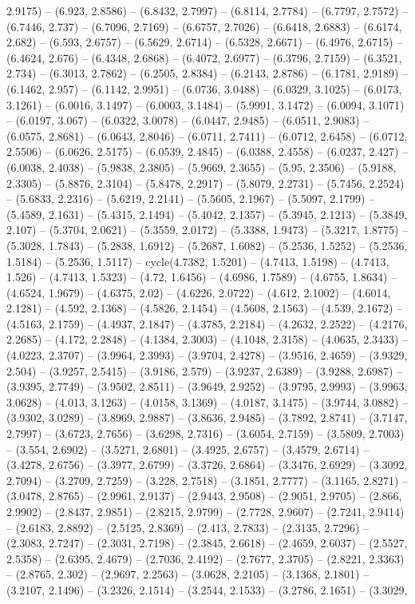 2.9175) -- (6.923, 2.8586) -- (6.8432, 2.7997) -- (6.8114, 2.7784) -- (6.7797, 2.7572) -- (6.7446, 2.737) -- (6.7096, 2.7169) -- (6.6757, 2.7026) -- (6.6418, 2.6883) -- (6.6174, 2.682) -- (6.593, 2.6757) -- (6.5629, 2.6714) -- (6.5328, 2.6671) -- (6.4976, 2.6715) -- (6.4624, 2.676) -- (6.4348, 2.6868) -- (6.4072, 2.6977) -- (6.3796, 2.7159) -- (6.3521, 2.734) -- (6.3013, 2.7862) -- (6.2505, 2.8384) -- (6.2143, 2.8786) -- (6.1781, 2.9189) -- (6.1462, 2.957) -- (6.1142, 2.9951) -- (6.0736, 3.0488) -- (6.0329, 3.1025) -- (6.0173, 3.1261) -- (6.0016, 3.1497) -- (6.0003, 3.1484) -- (5.9991, 3.1472) -- (6.0094, 3.1071) -- (6.0197, 3.067) -- (6.0322, 3.0078) -- (6.0447, 2.9485) -- (6.0511, 2.9083) -- (6.0575, 2.8681) -- (6.0643, 2.8046) -- (6.0711, 2.7411) -- (6.0712, 2.6458) -- (6.0712, 2.5506) -- (6.0626, 2.5175) -- (6.0539, 2.4845) -- (6.0388, 2.4558) -- (6.0237, 2.427) -- (6.0038, 2.4038) -- (5.9838, 2.3805) -- (5.9669, 2.3655) -- (5.95, 2.3506) -- (5.9188, 2.3305) -- (5.8876, 2.3104) -- (5.8478, 2.2917) -- (5.8079, 2.2731) -- (5.7456, 2.2524) -- (5.6833, 2.2316) -- (5.6219, 2.2141) -- (5.5605, 2.1967) -- (5.5097, 2.1799) -- (5.4589, 2.1631) -- (5.4315, 2.1494) -- (5.4042, 2.1357) -- (5.3945, 2.1213) -- (5.3849, 2.107) -- (5.3704, 2.0621) -- (5.3559, 2.0172) -- (5.3388, 1.9473) -- (5.3217, 1.8775) -- (5.3028, 1.7843) -- (5.2838, 1.6912) -- (5.2687, 1.6082) -- (5.2536, 1.5252) -- (5.2536, 1.5184) -- (5.2536, 1.5117) -- cycle(4.7382, 1.5201) -- (4.7413, 1.5198) -- (4.7413, 1.526) -- (4.7413, 1.5323) -- (4.72, 1.6456) -- (4.6986, 1.7589) -- (4.6755, 1.8634) -- (4.6524, 1.9679) -- (4.6375, 2.02) -- (4.6226, 2.0722) -- (4.612, 2.1002) -- (4.6014, 2.1281) -- (4.592, 2.1368) -- (4.5826, 2.1454) -- (4.5608, 2.1563) -- (4.539, 2.1672) -- (4.5163, 2.1759) -- (4.4937, 2.1847) -- (4.3785, 2.2184) -- (4.2632, 2.2522) -- (4.2176, 2.2685) -- (4.172, 2.2848) -- (4.1384, 2.3003) -- (4.1048, 2.3158) -- (4.0635, 2.3433) -- (4.0223, 2.3707) -- (3.9964, 2.3993) -- (3.9704, 2.4278) -- (3.9516, 2.4659) -- (3.9329, 2.504) -- (3.9257, 2.5415) -- (3.9186, 2.579) -- (3.9237, 2.6389) -- (3.9288, 2.6987) -- (3.9395, 2.7749) -- (3.9502, 2.8511) -- (3.9649, 2.9252) -- (3.9795, 2.9993) -- (3.9963, 3.0628) -- (4.013, 3.1263) -- (4.0158, 3.1369) -- (4.0187, 3.1475) -- (3.9744, 3.0882) -- (3.9302, 3.0289) -- (3.8969, 2.9887) -- (3.8636, 2.9485) -- (3.7892, 2.8741) -- (3.7147, 2.7997) -- (3.6723, 2.7656) -- (3.6298, 2.7316) -- (3.6054, 2.7159) -- (3.5809, 2.7003) -- (3.554, 2.6902) -- (3.5271, 2.6801) -- (3.4925, 2.6757) -- (3.4579, 2.6714) -- (3.4278, 2.6756) -- (3.3977, 2.6799) -- (3.3726, 2.6864) -- (3.3476, 2.6929) -- (3.3092, 2.7094) -- (3.2709, 2.7259) -- (3.228, 2.7518) -- (3.1851, 2.7777) -- (3.1165, 2.8271) -- (3.0478, 2.8765) -- (2.9961, 2.9137) -- (2.9443, 2.9508) -- (2.9051, 2.9705) -- (2.866, 2.9902) -- (2.8437, 2.9851) -- (2.8215, 2.9799) -- (2.7728, 2.9607) -- (2.7241, 2.9414) -- (2.6183, 2.8892) -- (2.5125, 2.8369) -- (2.413, 2.7833) -- (2.3135, 2.7296) -- (2.3083, 2.7247) -- (2.3031, 2.7198) -- (2.3845, 2.6618) -- (2.4659, 2.6037) -- (2.5527, 2.5358) -- (2.6395, 2.4679) -- (2.7036, 2.4192) -- (2.7677, 2.3705) -- (2.8221, 2.3363) -- (2.8765, 2.302) -- (2.9697, 2.2563) -- (3.0628, 2.2105) -- (3.1368, 2.1801) -- (3.2107, 2.1496) -- (3.2326, 2.1514) -- (3.2544, 2.1533) -- (3.2786, 2.1651) -- (3.3029, 